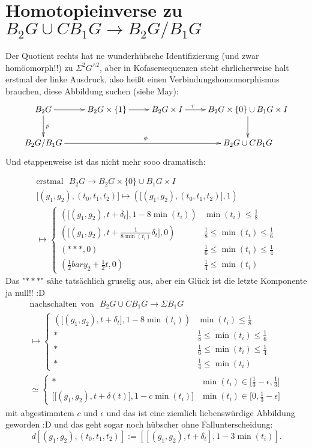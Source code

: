 \documentclass[11pt,twoside,a4paper]{scrbook} %
\begin{document}
\section{Homotopieinverse zu $B_2G\cup CB_1G\rightarrow B_2G/B_1G$}
Der Quotient rechts hat ne wunderh\"ubsche Identifizierung (und zwar hom\"oomorph!!) zu $\Sigma^2G^{\wedge2}$, aber in Kofasersequenzen steht ehrlicherweise
halt erstmal der linke Ausdruck, also hei\ss t einen Verbindungshomomorphismus brauchen, diese Abbildung suchen (siehe May):
$$\xymatrix{
B_2G \ar[d]^p \ar[r] &B_2G\times\{1\} \ar[r] &B_2G\times I \ar[r]^/-4ex/r & B_2G\times\{0\}\cup B_1G\times I \ar[d] \\
B_2G/B_1G\ar[rrr]^{\phi} &&& B_2G\cup CB_1G\\
}$$
Und etappenweise ist das nicht mehr sooo dramatisch:

$$\begin{aligned}
\mathrm{erstmal~~~} B_2G\rightarrow B_2G\times\{0\}\cup B_1G\times I\\
\lbrack(g_1,g_2),(t_0,t_1,t_2)\rbrack \mapsto (\lbrack (g_1,g_2),(t_0,t_1,t_2)\rbrack,1)\\
\mapsto {\begin{cases}
	  (\lbrack(g_1,g_2),t+\delta_t\rbrack,1-8\min(t_i))          & \min(t_i)\leq\frac18\\
          (\lbrack(g_1,g_2),t+\frac{1}{8\min(t_i)}\delta_t\rbrack,0) & \frac18\leq\min(t_i)\leq\frac16\\
          (***,0)					             & \frac16\leq\min(t_i)\leq\frac14\\
          (\frac12bary_2+\frac12 t,0)				     & \frac14\leq\min(t_i)
         \end{cases}}
\end{aligned}$$
Das "$***$" s\"ahe tats\"achlich gruselig aus, aber ein Gl\"uck ist die letzte Komponente ja null!! :D
$$\begin{aligned}
\mathrm{nachschalten~~ von~~~} B_2G\cup CB_1G\rightarrow \Sigma B_1G\\
\mapsto  {\begin{cases}
	  (\lbrack(g_1,g_2),t+\delta_t\rbrack,1-8\min(t_i))          & \min(t_i)\leq\frac18\\
          * & \frac18\leq\min(t_i)\leq\frac16\\
          * & \frac16\leq\min(t_i)\leq\frac14\\
          * & \frac14\leq\min(t_i)
         \end{cases}}\\
\simeq {\begin{cases}
          * & \min(t_i)\in\lbrack\frac13-\epsilon,\frac13\rbrack\\
          \lbrack\lbrack(g_1,g_2),t+\delta(t)\rbrack,1-c\min(t_i)\rbrack & \min(t_i)\in\lbrack0,\frac13-\epsilon\rbrack
       \end{cases}}
\end{aligned}$$
mit abgestimmtem $c$ und $\epsilon$ und das ist eine ziemlich liebensw\"urdige Abbildung geworden :D
und das geht sogar noch h\"ubscher ohne Fallunterscheidung:
$$d[(g_1,g_2),(t_0,t_1,t_2)]:=[[(g_1,g_2),t+\delta_t],1-3\min(t_i)].$$
\end{document}
